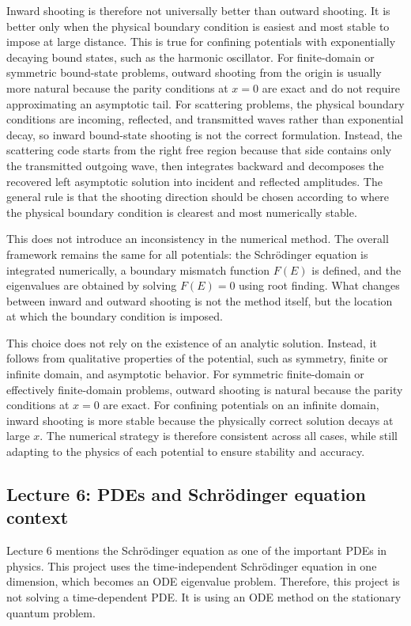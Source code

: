 \documentclass[11pt]{article}
\begin{document}
    Inward shooting is therefore not universally better than outward shooting. It is better only when the physical boundary condition is easiest and most stable to impose at large distance. This is true for confining potentials with exponentially decaying bound states, such as the harmonic oscillator. For finite-domain or symmetric bound-state problems, outward shooting from the origin is usually more natural because the parity conditions at $x=0$ are exact and do not require approximating an asymptotic tail. For scattering problems, the physical boundary conditions are incoming, reflected, and transmitted waves rather than exponential decay, so inward bound-state shooting is not the correct formulation. Instead, the scattering code starts from the right free region because that side contains only the transmitted outgoing wave, then integrates backward and decomposes the recovered left asymptotic solution into incident and reflected amplitudes. The general rule is that the shooting direction should be chosen according to where the physical boundary condition is clearest and most numerically stable.

    This does not introduce an inconsistency in the numerical method. The overall framework remains the same for all potentials: the Schr\"odinger equation is integrated numerically, a boundary mismatch function $F(E)$ is defined, and the eigenvalues are obtained by solving $F(E)=0$ using root finding. What changes between inward and outward shooting is not the method itself, but the location at which the boundary condition is imposed.

    This choice does not rely on the existence of an analytic solution. Instead, it follows from qualitative properties of the potential, such as symmetry, finite or infinite domain, and asymptotic behavior. For symmetric finite-domain or effectively finite-domain problems, outward shooting is natural because the parity conditions at $x=0$ are exact. For confining potentials on an infinite domain, inward shooting is more stable because the physically correct solution decays at large $x$. The numerical strategy is therefore consistent across all cases, while still adapting to the physics of each potential to ensure stability and accuracy.

    \subsection{Lecture 6: PDEs and Schr\"odinger equation context}

    Lecture 6 mentions the Schr\"odinger equation as one of the important PDEs in physics. This project uses the time-independent Schr\"odinger equation in one dimension, which becomes an ODE eigenvalue problem. Therefore, this project is not solving a time-dependent PDE. It is using an ODE method on the stationary quantum problem.
\end{document}
